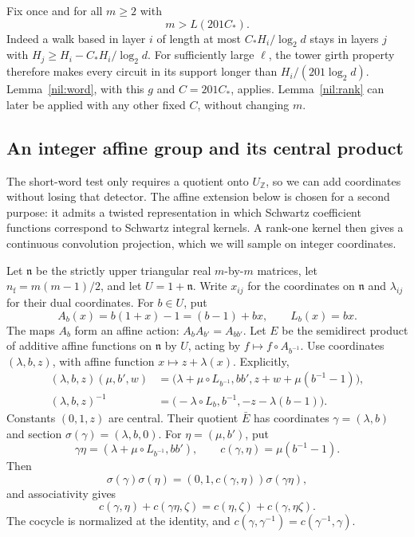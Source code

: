 Fix once and for all \(m\ge2\) with
\begin{equation}\label{nil:choice-m}
 m>L(201C_*).
\end{equation}
Indeed a walk based in layer \(i\) of length at most
\(C_*H_i/\log_2d\) stays in layers \(j\) with
\(H_j\ge H_i-C_*H_i/\log_2d\). For sufficiently large \(\ell\),
the tower girth property therefore makes every circuit in its
support longer than \(H_i/(201\log_2d)\). Lemma~\ref{nil:word},
with this \(g\) and \(C=201C_*\), applies. Lemma~\ref{nil:rank}
can later be applied with any other fixed \(C\), without changing \(m\).

\subsection{An integer affine group and its central product}

The short-word test only requires a quotient onto \(U_{\mathbb Z}\),
so we can add coordinates without losing that detector. The affine
extension below is chosen for a second purpose: it admits a twisted
representation in which Schwartz coefficient functions correspond to
Schwartz integral kernels. A rank-one kernel then gives a continuous
convolution projection, which we will sample on integer coordinates.

Let \(\mathfrak n\) be the strictly upper triangular real
\(m\)-by-\(m\) matrices, let \(n_{\mathrm f}=m(m-1)/2\), and let
\(U=1+\mathfrak n\). Write \(x_{ij}\) for the coordinates on
\(\mathfrak n\) and \(\lambda_{ij}\) for their dual coordinates.
For \(b\in U\), put
\[
 A_b(x)=b(1+x)-1=(b-1)+bx,\qquad L_b(x)=bx.
\]
The maps \(A_b\) form an affine action: \(A_bA_{b'}=A_{bb'}\).
Let \(E\) be the semidirect product of additive affine functions
on \(\mathfrak n\) by \(U\), acting by \(f\mapsto f\circ A_{b^{-1}}\).
Use coordinates \((\lambda,b,z)\), with affine function
\(x\mapsto z+\lambda(x)\). Explicitly,
\begin{align}
 (\lambda,b,z)(\mu,b',w)
 &=\bigl(\lambda+\mu\circ L_{b^{-1}},bb',
             z+w+\mu(b^{-1}-1)\bigr),\label{nil:affine-law}\\
 (\lambda,b,z)^{-1}
 &=\bigl(-\lambda\circ L_b,b^{-1},
             -z-\lambda(b-1)\bigr).\label{nil:affine-inverse}
\end{align}
Constants \((0,1,z)\) are central. Their quotient \(\bar E\) has
coordinates \(\gamma=(\lambda,b)\) and section
\(\sigma(\gamma)=(\lambda,b,0)\). For \(\eta=(\mu,b')\), put
\[
 \gamma\eta=(\lambda+\mu\circ L_{b^{-1}},bb'),\qquad
 c(\gamma,\eta)=\mu(b^{-1}-1).
\]
Then
\begin{equation}\label{nil:cocycle}
 \sigma(\gamma)\sigma(\eta)
       =(0,1,c(\gamma,\eta))\sigma(\gamma\eta),
\end{equation}
and associativity gives
\[
 c(\gamma,\eta)+c(\gamma\eta,\zeta)
   =c(\eta,\zeta)+c(\gamma,\eta\zeta).
\]
The cocycle is normalized at the identity, and
\(c(\gamma,\gamma^{-1})=c(\gamma^{-1},\gamma)\).

